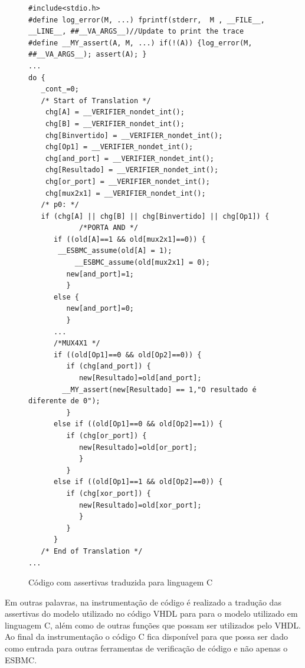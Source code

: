 \begin{figure}[H]
\caption{\label{fig:assert_c} Código com assertivas traduzida para linguagem C}
	\begin{center}
    \begin{minipage}{0.99\textwidth}
    \begin{lstlisting}       
#include<stdio.h>
#define log_error(M, ...) fprintf(stderr,  M , __FILE__, __LINE__, ##__VA_ARGS__)//Update to print the trace
#define __MY_assert(A, M, ...) if(!(A)) {log_error(M, ##__VA_ARGS__); assert(A); }
...
do {
   _cont_=0;
   /* Start of Translation */
    chg[A] = __VERIFIER_nondet_int(); 
    chg[B] = __VERIFIER_nondet_int(); 
    chg[Binvertido] = __VERIFIER_nondet_int(); 
    chg[Op1] = __VERIFIER_nondet_int();
    chg[and_port] = __VERIFIER_nondet_int();
    chg[Resultado] = __VERIFIER_nondet_int();
    chg[or_port] = __VERIFIER_nondet_int();
    chg[mux2x1] = __VERIFIER_nondet_int();
   /* p0: */
   if (chg[A] || chg[B] || chg[Binvertido] || chg[Op1]) {
            /*PORTA AND */
      if ((old[A]==1 && old[mux2x1]==0)) {
	   __ESBMC_assume(old[A] = 1);
           __ESBMC_assume(old[mux2x1] = 0);
         new[and_port]=1;
         }
      else {
         new[and_port]=0;
         }
      ...
      /*MUX4X1 */
      if ((old[Op1]==0 && old[Op2]==0)) {
         if (chg[and_port]) {
            new[Resultado]=old[and_port];
	    __MY_assert(new[Resultado] == 1,"O resultado é diferente de 0");
         }
      else if ((old[Op1]==0 && old[Op2]==1)) {
         if (chg[or_port]) {
            new[Resultado]=old[or_port];
            }
         }
      else if ((old[Op1]==1 && old[Op2]==0)) {
         if (chg[xor_port]) {
            new[Resultado]=old[xor_port];
            }
         }
      }
   /* End of Translation */
...
    \end{lstlisting}
    \end{minipage}
	\end{center}
\end{figure}

\par
Em outras palavras, na instrumentação de código é realizado a tradução das assertivas do modelo utilizado no código VHDL para para o modelo utilizado em linguagem C, além como de outras funções que possam ser utilizados pelo VHDL. Ao final da instrumentação o código C fica disponível para que possa ser dado como entrada para outras ferramentas de verificação de código e não apenas o ESBMC.

